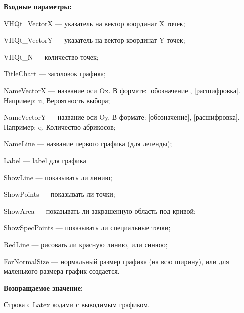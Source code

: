 \textbf{Входные параметры:}

VHQt\_VectorX --- указатель на вектор координат X точек;
 
VHQt\_VectorY --- указатель на вектор координат Y точек;
 
VHQt\_N --- количество точек;
 
TitleChart --- заголовок графика;
 
NameVectorX --- название оси Ox. В формате: [обозначение], [расшифровка]. Например: u, Вероятность выбора;
 
NameVectorY --- название оси Oy. В формате: [обозначение], [расшифровка]. Например: q, Количество абрикосов;
 
NameLine --- название первого графика (для легенды);
 
Label --- label для графика
 
ShowLine --- показывать ли линию;
 
ShowPoints --- показывать ли точки;
 
ShowArea --- показывать ли закрашенную область под кривой;
 
ShowSpecPoints --- показывать ли специальные точки;
 
RedLine --- рисовать ли красную линию, или синюю;
 
ForNormalSize --- нормальный размер графика (на всю ширину), или для маленького размера график создается.
	
\textbf{Возвращаемое значение:}

Строка с Latex кодами с выводимым графиком.